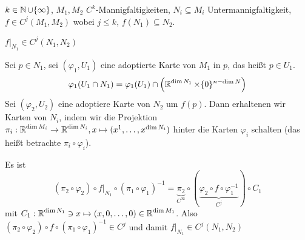 \begin{Loes}
$k \in \operatorname{\mathbb{N}} \cup \{\infty\}$, $M_1, M_2$ $C^k$-Mannigfaltigkeiten, $N_i \subseteq M_i$ Untermannigfaltigkeit, $f \in C^j(M_1, M_2)$ wobei $j \le k$, $f(N_1) \subseteq N_2$.
\begin{description}[font=\normalfont\itshape]
\item[Behauptung:]
	$f|_{N_1} \in C^j(N_1, N_2)$
\item[Beweis:]
	Sei $p \in N_1$, sei $(\varphi_1, U_1)$ eine adoptierte Karte von $M_1$ in $p$, das hei\ss t $p \in U_1$.
		\[ \varphi_1(U_1 \cap N_1) = \varphi_1(U_1) \cap \left(\operatorname{\mathbb{R}}^{\operatorname{dim} N_1} \times \{0\}^{n-\operatorname{dim} N}\right) \]
	Sei $(\varphi_2, U_2)$ eine adoptiere Karte von $N_2$ um $f(p)$. Dann erhaltenen wir Karten von $N_i$, indem wir die Projektion $\pi_i: \operatorname{\mathbb{R}}^{\operatorname{dim} M_i} \to \operatorname{\mathbb{R}}^{\operatorname{dim} N_i}, x \mapsto (x^1,\ldots ,x^{\operatorname{dim} N_i})$ hinter die Karten $\varphi_i$ schalten (das hei\ss t betrachte $\pi_i \circ \varphi_i$).
	
	Es ist
		\[(\pi_2 \circ \varphi_2) \circ f|_{N_1} \circ (\pi_1 \circ \varphi_1)^{-1} = \underbrace{\pi_2}_{C^\infty} \circ (\underbrace{\varphi_2 \circ f \circ \varphi_1^{-1}}_{C^j}) \circ C_1\]
	mit $C_1: \operatorname{\mathbb{R}}^{\operatorname{dim} N_1} \ni x \mapsto (x, 0,\ldots ,0) \in \operatorname{\mathbb{R}}^{\operatorname{dim} M_1}$. Also $(\pi_2 \circ \varphi_2) \circ f \circ (\pi_1 \circ \varphi_1)^{-1} \in C^j$ und damit $f|_{N_1} \in C^j(N_1, N_2)$
\end{description}
\end{Loes}

